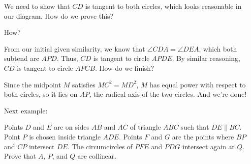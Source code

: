 


We need to show that $CD$ is tangent to both circles, which looks reasonable in our diagram. How do we prove this?


How?




From our initial given similarity, we know that $\angle CDA = \angle DEA$, which both subtend arc $APD$. Thus, $CD$ is tangent to circle $APDE$. By similar reasoning, $CD$ is tangent to circle $APCB$. How do we finish?






Since the midpoint $M$ satisfies $MC^2 = MD^2$, $M$ has equal power with respect to both circles, so it lies on $AP$, the radical axis of the two circles. And we're done!

Next example:

\begin{example}
Points $D$ and $E$ are on sides $AB$ and $AC$ of triangle $ABC$ such that $DE \parallel BC$.  Point $P$ is chosen inside triangle $ADE$.  Points $F$ and $G$ are the points where $BP$ and $CP$ intersect $DE$.  The circumcircles of $PFE$ and $PDG$ intersect again at $Q$.  Prove that $A$, $P$, and $Q$ are collinear.
    
\end{example}


